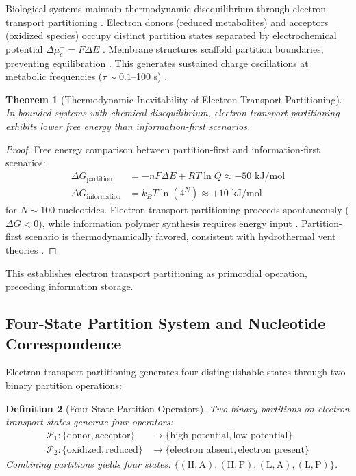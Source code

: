 \documentclass[11pt,a4paper]{article}
\newtheorem{theorem}{Theorem}[section]
\newtheorem{definition}[theorem]{Definition}
\theoremstyle{remark}
\begin{document}
Biological systems maintain thermodynamic disequilibrium through electron transport partitioning \citep{nicholls2013bioenergetics, mitchell1961coupling, beinert1997iron}. Electron donors (reduced metabolites) and acceptors (oxidized species) occupy distinct partition states separated by electrochemical potential $\Delta\mu_e^- = F\Delta E$ \citep{mitchell1961coupling}. Membrane structures scaffold partition boundaries, preventing equilibration \citep{nicholls2013bioenergetics}. This generates sustained charge oscillations at metabolic frequencies ($\tau \sim 0.1$--100 s) \citep{goldbeter1996biochemical, Sachikonye2025_Origins}.

\begin{theorem}[Thermodynamic Inevitability of Electron Transport Partitioning]
\label{thm:electron_partition}
In bounded systems with chemical disequilibrium, electron transport partitioning exhibits lower free energy than information-first scenarios.
\end{theorem}

\begin{proof}
Free energy comparison between partition-first and information-first scenarios:
\begin{align}
\Delta G_{\text{partition}} &= -nF\Delta E + RT\ln Q \approx -50 \text{ kJ/mol} \\
\Delta G_{\text{information}} &= k_BT \ln(4^N) \approx +10 \text{ kJ/mol}
\end{align}
for $N \sim 100$ nucleotides. Electron transport partitioning proceeds spontaneously ($\Delta G < 0$), while information polymer synthesis requires energy input \citep{orgel1968evolution, orgel2004prebiotic}. Partition-first scenario is thermodynamically favored, consistent with hydrothermal vent theories \citep{russell2007alkaline}.
\end{proof}

This establishes electron transport partitioning as primordial operation, preceding information storage.

\subsection{Four-State Partition System and Nucleotide Correspondence}

Electron transport partitioning generates four distinguishable states through two binary partition operations:

\begin{definition}[Four-State Partition Operators]
\label{def:four_state}
Two binary partitions on electron transport states generate four operators:
\begin{align}
\mathcal{P}_1: \{\text{donor}, \text{acceptor}\} &\to \{\text{high potential}, \text{low potential}\} \\
\mathcal{P}_2: \{\text{oxidized}, \text{reduced}\} &\to \{\text{electron absent}, \text{electron present}\}
\end{align}
Combining partitions yields four states: $\{(\text{H},\text{A}), (\text{H},\text{P}), (\text{L},\text{A}), (\text{L},\text{P})\}$.
\end{definition}
\end{document}
